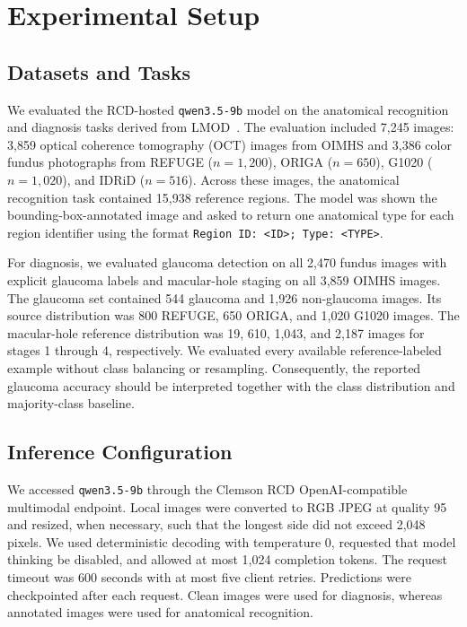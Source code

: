 \section{Experimental Setup}
\label{sec:experiments}

\subsection{Datasets and Tasks}

We evaluated the RCD-hosted \texttt{qwen3.5-9b} model on the anatomical
recognition and diagnosis tasks derived from LMOD~\cite{qin2025lmod}.  The
evaluation included 7,245 images: 3,859 optical coherence tomography (OCT)
images from OIMHS and 3,386 color fundus photographs from REFUGE
($n=1{,}200$), ORIGA ($n=650$), G1020 ($n=1{,}020$), and IDRiD ($n=516$).
Across these images, the anatomical recognition task contained 15,938
reference regions.  The model was shown the bounding-box-annotated image and
asked to return one anatomical type for each region identifier using the
format \texttt{Region ID: <ID>; Type: <TYPE>}.

For diagnosis, we evaluated glaucoma detection on all 2,470 fundus images
with explicit glaucoma labels and macular-hole staging on all 3,859 OIMHS
images.  The glaucoma set contained 544 glaucoma and 1,926 non-glaucoma
images.  Its source distribution was 800 REFUGE, 650 ORIGA, and 1,020 G1020
images.  The macular-hole reference distribution was 19, 610, 1,043, and
2,187 images for stages 1 through 4, respectively.  We evaluated every
available reference-labeled example without class balancing or resampling.
Consequently, the reported glaucoma accuracy should be interpreted together
with the class distribution and majority-class baseline.

\subsection{Inference Configuration}

We accessed \texttt{qwen3.5-9b} through the Clemson RCD OpenAI-compatible
multimodal endpoint.  Local images were converted to RGB JPEG at quality 95
and resized, when necessary, such that the longest side did not exceed 2,048
pixels.  We used deterministic decoding with temperature 0, requested that
model thinking be disabled, and allowed at most 1,024 completion tokens.  The
request timeout was 600 seconds with at most five client retries.  Predictions
were checkpointed after each request.  Clean images were used for diagnosis,
whereas annotated images were used for anatomical recognition.

